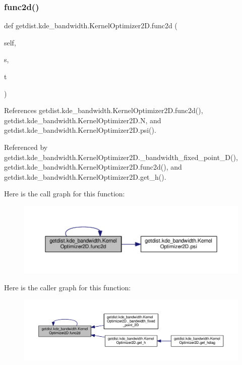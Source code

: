 \subsubsection{\texorpdfstring{func2d()}{func2d()}}
{\footnotesize\ttfamily def getdist.\+kde\+\_\+bandwidth.\+Kernel\+Optimizer2\+D.\+func2d (\begin{DoxyParamCaption}\item[{}]{self,  }\item[{}]{s,  }\item[{}]{t }\end{DoxyParamCaption})}



References getdist.\+kde\+\_\+bandwidth.\+Kernel\+Optimizer2\+D.\+func2d(), getdist.\+kde\+\_\+bandwidth.\+Kernel\+Optimizer2\+D.\+N, and getdist.\+kde\+\_\+bandwidth.\+Kernel\+Optimizer2\+D.\+psi().



Referenced by getdist.\+kde\+\_\+bandwidth.\+Kernel\+Optimizer2\+D.\+\_\+bandwidth\+\_\+fixed\+\_\+point\+\_\+D(), getdist.\+kde\+\_\+bandwidth.\+Kernel\+Optimizer2\+D.\+func2d(), and getdist.\+kde\+\_\+bandwidth.\+Kernel\+Optimizer2\+D.\+get\+\_\+h().

Here is the call graph for this function\+:
\nopagebreak
\begin{figure}[H]
\begin{center}
\leavevmode
\includegraphics[width=350pt]{classgetdist_1_1kde__bandwidth_1_1KernelOptimizer2D_a7a5cd818acd3bd52ec4ecbee0ff3366d_cgraph}
\end{center}
\end{figure}
Here is the caller graph for this function\+:
\nopagebreak
\begin{figure}[H]
\begin{center}
\leavevmode
\includegraphics[width=350pt]{classgetdist_1_1kde__bandwidth_1_1KernelOptimizer2D_a7a5cd818acd3bd52ec4ecbee0ff3366d_icgraph}
\end{center}
\end{figure}
\mbox{\label{classgetdist_1_1kde__bandwidth_1_1KernelOptimizer2D_ac0096bcca95e418b999498142fe3e411}} 
